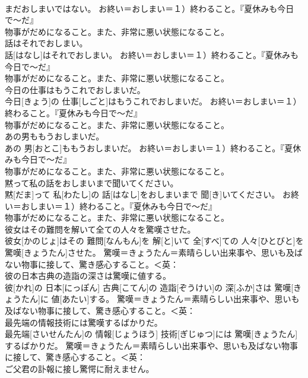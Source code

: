 \documentclass[8pt]{extreport}
\begin{document}
\begin{CJK}{UTF8}{min}
{\\	まだおしまいではない。	お終い＝おしまい＝１）終わること。『夏休みも今日で〜だ』 　　　　　　　　　
\\	物事がだめになること。また、非常に悪い状態になること。
\\	話はそれでおしまい。	
\\	話[はなし]はそれでおしまい。	お終い＝おしまい＝１）終わること。『夏休みも今日で〜だ』 　　　　　　　　　
\\	物事がだめになること。また、非常に悪い状態になること。
\\	今日の仕事はもうこれでおしまいだ。	
\\	今日[きょう]の 仕事[しごと]はもうこれでおしまいだ。	お終い＝おしまい＝１）終わること。『夏休みも今日で〜だ』 　　　　　　　　　
\\	物事がだめになること。また、非常に悪い状態になること。
\\	あの男ももうおしまいだ。	
\\	あの 男[おとこ]ももうおしまいだ。	お終い＝おしまい＝１）終わること。『夏休みも今日で〜だ』 　　　　　　　　　
\\	物事がだめになること。また、非常に悪い状態になること。
\\	黙って私の話をおしまいまで聞いてください。	
\\	黙[だま]って 私[わたし]の 話[はなし]をおしまいまで 聞[き]いてください。	お終い＝おしまい＝１）終わること。『夏休みも今日で〜だ』 　　　　　　　　　
\\	物事がだめになること。また、非常に悪い状態になること。
\\	彼女はその難問を解いて全ての人々を驚嘆させた。	
\\	彼女[かのじょ]はその 難問[なんもん]を 解[と]いて 全[すべ]ての 人々[ひとびと]を 驚嘆[きょうたん]させた。	驚嘆＝きょうたん＝素晴らしい出来事や、思いも及ばない物事に接して、驚き感心すること。＜英：
\\	彼の日本古典の造詣の深さは驚嘆に値する。	
\\	彼[かれ]の 日本[にっぽん] 古典[こてん]の 造詣[ぞうけい]の 深[ふか]さは 驚嘆[きょうたん]に 値[あたい]する。	驚嘆＝きょうたん＝素晴らしい出来事や、思いも及ばない物事に接して、驚き感心すること。＜英：
\\	最先端の情報技術には驚嘆するばかりだ。	
\\	最先端[さいせんたん]の 情報[じょうほう] 技術[ぎじゅつ]には 驚嘆[きょうたん]するばかりだ。	驚嘆＝きょうたん＝素晴らしい出来事や、思いも及ばない物事に接して、驚き感心すること。＜英：
\\	ご父君の訃報に接し驚愕に耐えません。	
}
\end{CJK}
\end{document}
